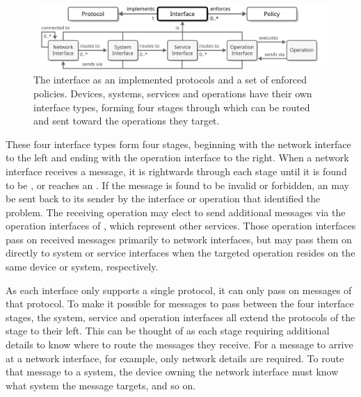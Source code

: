 \begin{figure}[ht!]
  \centering
  \includegraphics[scale=0.9]{figures/interface}
  \caption{
    The interface as an implemented protocols and a set of enforced policies.
    Devices, systems, services and operations have their own interface types, forming four stages through which  can be routed and  sent toward the operations they target.
  }
  \label{fig:interface}
\end{figure}

These four interface types form four stages, beginning with the network interface to the left and ending with the operation interface to the right.
When a network interface receives a message, it is  rightwards through each stage until it is found to be ,  or reaches an .
If the message is found to be invalid or forbidden, an  may be sent back to its sender by the interface or operation that identified the problem.
The receiving operation may elect to send additional messages via the operation interfaces of , which represent other services.
Those operation interfaces pass on received messages primarily to network interfaces, but may pass them on directly to system or service interfaces when the targeted operation resides on the same device or system, respectively.

As each interface only supports a single protocol, it can only pass on messages of that protocol.
To make it possible for messages to pass between the four interface stages, the system, service and operation interfaces all extend the protocols of the stage to their left.
This can be thought of as each stage requiring additional details to know where to route the messages they receive.
For a message to arrive at a network interface, for example, only network details are required.
To route that message to a system, the device owning the network interface must know what system the message targets, and so on.

